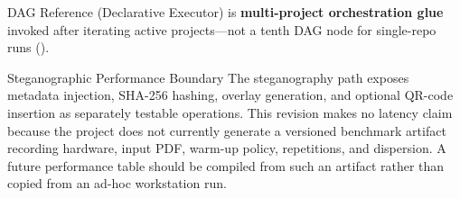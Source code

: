 \documentclass[
  ignorenonframetext,
]{beamer}
\begin{document}
\begin{frame}{DAG Reference (Declarative
Executor)}
 is
\textbf{multi-project orchestration glue} invoked after iterating active
projects---not a tenth DAG node for single-repo runs
().
\end{frame}

\begin{frame}[allowframebreaks]{Steganographic Performance Boundary}
\protect{}\label{steganographic-performance-boundary}
The steganography path exposes metadata injection, SHA-256 hashing,
overlay generation, and optional QR-code insertion as separately
testable operations. This revision makes no latency claim because the
project does not currently generate a versioned benchmark artifact
recording hardware, input PDF, warm-up policy, repetitions, and
dispersion. A future performance table should be compiled from such an
artifact rather than copied from an ad-hoc workstation run.
\end{frame}
\end{document}
